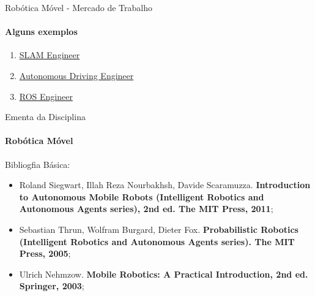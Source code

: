 \documentclass{beamer}
\begin{document}
\begin{frame}[t]{Robótica Móvel - Mercado de Trabalho}
	\framesubtitle{Alguns exemplos}

	\begin{enumerate}
		\item \href{https://www.indeed.com/q-Slam-Engineer-jobs.html}{SLAM Engineer}
		\item \href{https://www.indeed.com/q-Autonomous-Driving-Engineer-jobs.html}{Autonomous Driving Engineer}
		\item \href{http://wiki.ros.org/Jobs}{ROS Engineer}
	\end{enumerate}
\end{frame}


\begin{frame}[c]{Ementa da Disciplina}
	\framesubtitle{Robótica Móvel}

	\begin{block}{Bibliogfia Básica:}
	\end{block}
	\begin{itemize}
		\justifying
		\item Roland Siegwart, Illah Reza Nourbakhsh, Davide Scaramuzza. \textbf{Introduction to Autonomous Mobile Robots (Intelligent Robotics and Autonomous Agents series), 2nd ed. The MIT Press, 2011};
		\item Sebastian Thrun, Wolfram Burgard, Dieter Fox. \textbf{Probabilistic Robotics (Intelligent Robotics and Autonomous Agents series). The MIT Press, 2005};
		\item Ulrich Nehmzow. \textbf{Mobile Robotics: A Practical Introduction, 2nd ed. Springer, 2003};
	\end{itemize}
\end{frame}
\end{document}
